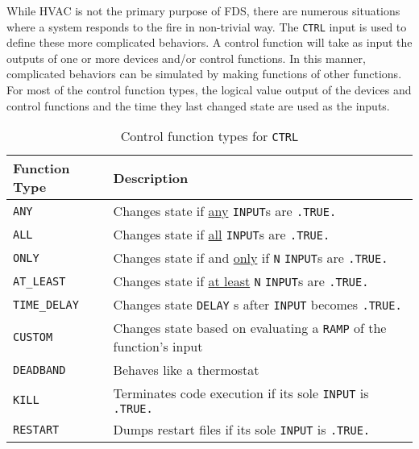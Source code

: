 \documentclass[11pt]{book}
\newcommand{\ct}{\tt\small}
\begin{document}
While HVAC is not the primary purpose of FDS, there are numerous situations where a system responds to
the fire in non-trivial way.  The {\ct CTRL} input is used to define these more complicated behaviors.
A control function will take as input the outputs of one or more devices and/or control functions.
In this manner, complicated behaviors can be simulated by making functions of other functions.  For most of the
control function types, the logical value output of the devices and control functions and the time they last changed
state are used as the inputs.


\begin{table}[h!]
\caption{Control function types for {\ct CTRL}}
\label{tab:funcvalues} 
\begin{center}
\begin{tabular}{|l||l|}
\hline
Function Type                     & Description   \\ \hline \hline
{\ct ANY}                         & Changes state if \underline{any} {\ct INPUT}s are {\ct .TRUE.}     \\ \hline
{\ct ALL}                         & Changes state if \underline{all} {\ct INPUT}s are {\ct .TRUE.}  \\ \hline
{\ct ONLY}                        & Changes state if and \underline{only} if {\ct N} {\ct INPUT}s are {\ct .TRUE.}     \\ \hline
{\ct AT\_LEAST}                   & Changes state if \underline{at least} {\ct N} {\ct INPUT}s are {\ct .TRUE.}     \\ \hline \hline
{\ct TIME\_DELAY}                 & Changes state {\ct DELAY} s after {\ct INPUT} becomes {\ct .TRUE.}      \\ \hline
{\ct CUSTOM}                      & Changes state based on evaluating a {\ct RAMP} of the function's input     \\ \hline
{\ct DEADBAND}                    & Behaves like a thermostat     \\ \hline
{\ct KILL}                        & Terminates code execution if its sole {\ct INPUT} is {\ct .TRUE.}  \\ \hline
{\ct RESTART}                     & Dumps restart files if its sole {\ct INPUT} is {\ct .TRUE.} \\ \hline
\end{tabular}
\end{center}
\end{table}
\end{document}
